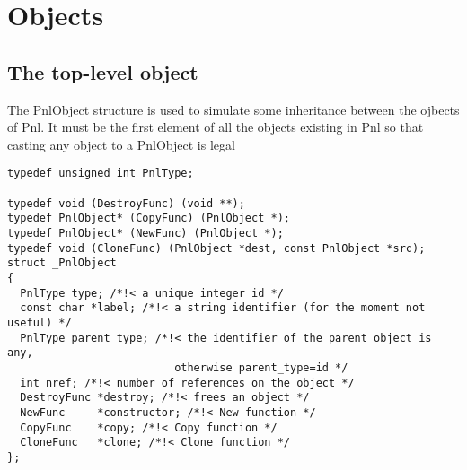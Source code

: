 \section{Objects}

\subsection{The top-level object}

The PnlObject structure is used to simulate some inheritance between the
ojbects of Pnl.  It must be the first element of all the objects existing in
Pnl so that casting any object to a PnlObject is legal

\begin{verbatim}
typedef unsigned int PnlType; 

typedef void (DestroyFunc) (void **);
typedef PnlObject* (CopyFunc) (PnlObject *);
typedef PnlObject* (NewFunc) (PnlObject *);
typedef void (CloneFunc) (PnlObject *dest, const PnlObject *src);
struct _PnlObject
{
  PnlType type; /*!< a unique integer id */
  const char *label; /*!< a string identifier (for the moment not useful) */
  PnlType parent_type; /*!< the identifier of the parent object is any,
                          otherwise parent_type=id */
  int nref; /*!< number of references on the object */ 
  DestroyFunc *destroy; /*!< frees an object */
  NewFunc     *constructor; /*!< New function */
  CopyFunc    *copy; /*!< Copy function */
  CloneFunc   *clone; /*!< Clone function */
};
\end{verbatim}

